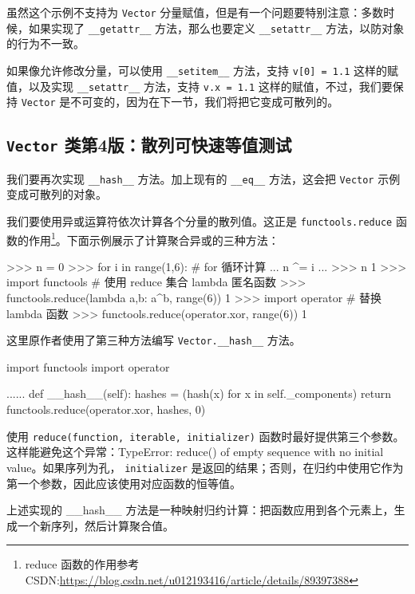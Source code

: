 虽然这个示例不支持为 \texttt{Vector} 分量赋值，但是有一个问题要特别注意：多数时候，如果实现了 \texttt{\_\_getattr\_\_} 方法，那么也要定义 \texttt{\_\_setattr\_\_} 方法，以防对象的行为不一致。

如果像允许修改分量，可以使用 \texttt{\_\_setitem\_\_} 方法，支持 \texttt{v[0] = 1.1} 这样的赋值，以及实现 \texttt{\_\_setattr\_\_} 方法，支持 \texttt{v.x = 1.1} 这样的赋值，不过，我们要保持 \texttt{Vector} 是不可变的，因为在下一节，我们将把它变成可散列的。

\subsection{\texttt{Vector} 类第4版：散列可快速等值测试}

我们要再次实现 \texttt{\_\_hash\_\_} 方法。加上现有的 \texttt{\_\_eq\_\_} 方法，这会把 \texttt{Vector} 示例变成可散列的对象。

我们要使用异或运算符依次计算各个分量的散列值。这正是 \texttt{functools.reduce} 函数的作用\footnote{reduce 函数的作用参考 CSDN:\url{https://blog.csdn.net/u012193416/article/details/89397388}}。下面示例展示了计算聚合异或的三种方法：

\begin{python}
>>> n = 0
>>> for i in range(1,6):     # for 循环计算
...     n ^= i
...     
>>> n
1
>>> import functools        # 使用 reduce 集合 lambda 匿名函数
>>> functools.reduce(lambda a,b: a^b, range(6))
1
>>> import operator         # 替换 lambda 函数
>>> functools.reduce(operator.xor, range(6))
1
\end{python}

这里原作者使用了第三种方法编写 \texttt{Vector.\_\_hash\_\_} 方法。

\begin{python}
import functools
import operator

......
    def __hash__(self):
        hashes = (hash(x) for x in self._components)
        return functools.reduce(operator.xor, hashes, 0)
\end{python}

使用 \texttt{reduce(function, iterable, initializer)} 函数时最好提供第三个参数。这样能避免这个异常：TypeError: reduce() of empty sequence with no initial value。如果序列为孔， \texttt{initializer} 是返回的结果；否则，在归约中使用它作为第一个参数，因此应该使用对应函数的恒等值。

上述实现的 \_\_hash\_\_ 方法是一种映射归约计算：把函数应用到各个元素上，生成一个新序列，然后计算聚合值。

